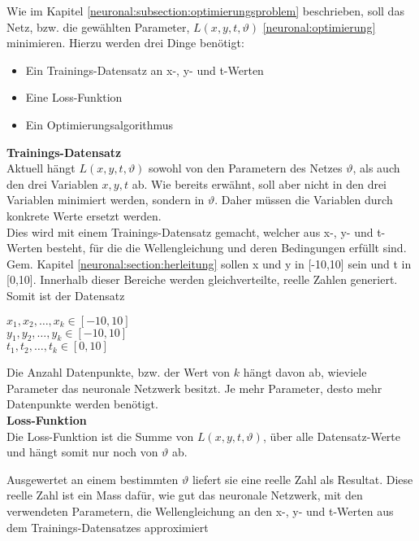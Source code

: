 Wie im Kapitel \ref{neuronal:subsection:optimierungsproblem} beschrieben, soll das Netz, bzw. die gewählten Parameter, \( L(x, y, t, \vartheta) \) \eqref{neuronal:optimierung} minimieren.
Hierzu werden drei Dinge benötigt:
\begin{itemize}
    \item Ein Trainings-Datensatz an x-, y- und t-Werten
    \item Eine Loss-Funktion
    \item Ein Optimierungsalgorithmus\\
\end{itemize}

\textbf{Trainings-Datensatz}\\
Aktuell hängt \( L(x, y, t, \vartheta) \) sowohl von den Parametern des Netzes \( \vartheta \), als auch den drei Variablen \( x, y, t \) ab.
Wie bereits erwähnt, soll aber nicht in den drei Variablen minimiert werden, sondern in \( \vartheta \).
Daher müssen die Variablen durch konkrete Werte ersetzt werden. \\

Dies wird mit einem Trainings-Datensatz gemacht, welcher aus x-, y- und t-Werten besteht, für die die Wellengleichung und deren Bedingungen erfüllt sind.
Gem. Kapitel \ref{neuronal:section:herleitung} sollen x und y in [-10,10] sein und t in [0,10].
Innerhalb dieser Bereiche werden gleichverteilte, reelle Zahlen generiert.
Somit ist der Datensatz
\begin{center}
    \( x_1, x_2, \ldots, x_k \in [-10,10] \)\\
    \( y_1, y_2, \ldots, y_k \in [-10,10] \)\\
    \( t_1, t_2, \ldots, t_k \in [0,10] \)\\
\end{center}

Die Anzahl Datenpunkte, bzw. der Wert von \( k \) hängt davon ab, wieviele Parameter das neuronale Netzwerk besitzt.
Je mehr Parameter, desto mehr Datenpunkte werden benötigt.\\


\textbf{Loss-Funktion}\\
Die Loss-Funktion ist die Summe von \( L(x, y, t, \vartheta) \), über alle Datensatz-Werte und hängt somit nur noch von \( \vartheta \) ab. 

Ausgewertet an einem bestimmten \( \vartheta \) liefert sie eine reelle Zahl als Resultat.
Diese reelle Zahl ist ein Mass dafür, wie gut das neuronale Netzwerk, mit den verwendeten Parametern, die Wellengleichung an den x-, y- und t-Werten aus dem Trainings-Datensatzes approximiert


